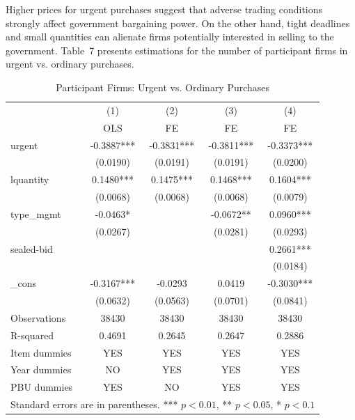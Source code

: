Higher prices for urgent purchases suggest that adverse trading conditions strongly affect government bargaining power. On the other hand, tight deadlines and small quantities can alienate firms potentially interested in selling to the government. Table~7 presents estimations for the number of participant firms in urgent vs. ordinary purchases.

\begin{table}[ht]
  \centering
  \caption{Participant Firms: Urgent vs. Ordinary Purchases}
  \begin{tabular}{lcccc}
    \hline
           & (1)        & (2)        & (3)        & (4)        \\
           & OLS       & FE         & FE         & FE         \\
    \hline
    urgent     & -0.3887*** & -0.3831*** & -0.3811*** & -0.3373*** \\
               & (0.0190)   & (0.0191)   & (0.0191)   & (0.0200)   \\
    lquantity  & 0.1480***  & 0.1475***  & 0.1468***  & 0.1604***  \\
               & (0.0068)   & (0.0068)   & (0.0068)   & (0.0079)   \\
    type\_mgmt & -0.0463*   &           & -0.0672**  & 0.0960***  \\
               & (0.0267)   &           & (0.0281)   & (0.0293)   \\
    sealed-bid &           &           &           & 0.2661***  \\
               &           &           &           & (0.0184)   \\
    \_cons     & -0.3167*** & -0.0293    & 0.0419     & -0.3030*** \\
               & (0.0632)   & (0.0563)   & (0.0701)   & (0.0841)   \\
    Observations & 38430   & 38430     & 38430     & 38430     \\
    R-squared  & 0.4691    & 0.2645    & 0.2647    & 0.2886    \\
    Item dummies & YES     & YES       & YES       & YES       \\
    Year dummies & NO      & YES       & YES       & YES       \\
    PBU dummies & YES      & NO        & YES       & YES       \\
    \hline
    \multicolumn{5}{l}{\footnotesize Standard errors are in parentheses. *** $p<0.01$, ** $p<0.05$, * $p<0.1$}
  \end{tabular}
\end{table}

